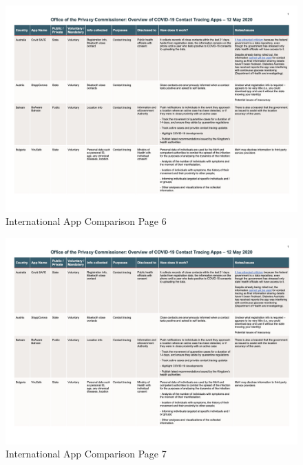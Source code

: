 \documentclass{scrreprt}
\begin{document}
\begin{figure}[H]
	\centering
	\includegraphics[page=6, width=0.9\linewidth]{2020-05-12-OPC-Comparison-of-COVID-19-Apps-colours}
	\caption{International App Comparison Page 6}
	\label{fig:6_2020-05-12-OPC-Comparison-of-COVID-19-Apps-colours}
\end{figure}
\begin{figure}[H]
	\centering
	\includegraphics[page=7, width=0.9\linewidth]{2020-05-12-OPC-Comparison-of-COVID-19-Apps-colours}
	\caption{International App Comparison Page 7}
	\label{fig:7_2020-05-12-OPC-Comparison-of-COVID-19-Apps-colours}
\end{figure}
\end{document}
